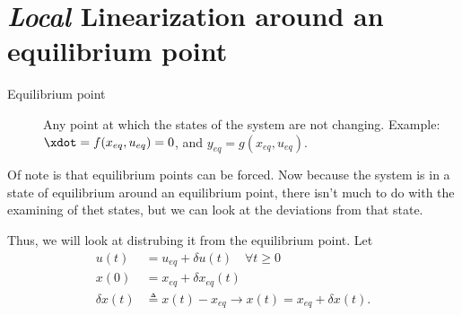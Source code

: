 \documentclass[10pt]{article}
\begin{document}
\section{\emph{Local} Linearization around an equilibrium point}
\begin{description}
\item[Equilibrium point] Any point at which the states of the system
  are not changing.  Example: $\xdot = f(x_{eq}, u_{eq}) = 0$, and
  $y_{eq} = g(x_{eq},u_{eq})$.
\end{description}
Of note is that equilibrium points can be forced.
Now because the system is in a state of equilibrium around an
equilibrium point, there isn't much to do with the examining of thet
states, but we can look at the deviations from that state.

Thus, we will look at distrubing it from the equilibrium point.  Let 
\begin{equation}
  \begin{split}
    u(t) &= u_{eq} + \delta u(t) \quad \forall t \ge 0\\
    x(0) &= x_{eq} + \delta x_{eq}(t)\\
    \delta x(t) &\triangleq x(t) - x_{eq} \rightarrow x(t) = x_{eq} +
    \delta x(t). 
  \end{split}
\end{equation}
\end{document}
